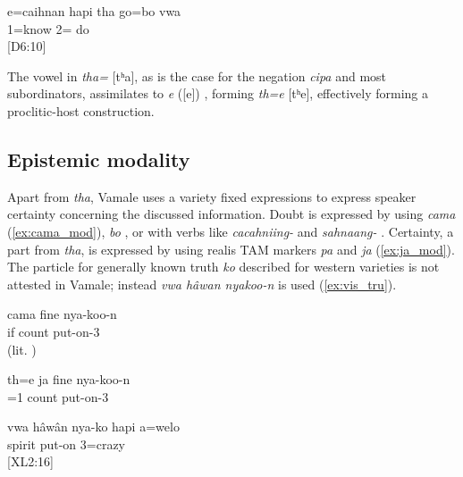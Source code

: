 \ea \label{ex:tha_bo}
\gll e=caihnan hapi {tha} go={bo} vwa\\
 1=know   2= do\\
\glt {} {[D6:10]}
\z

The vowel in \textit{tha=} [tʰa], as is the case for the negation \textit{cipa} and most subordinators, assimilates to \textit{e} ([e]) , forming \textit{th=e} [tʰe], effectively forming a proclitic-host construction.

\subsection{Epistemic modality}
\begin{sloppypar}
Apart from \textit{tha}, Vamale uses a variety fixed expressions to express speaker certainty concerning the discussed information. Doubt is expressed by using \textit{cama}  (\ref{ex:cama_mod}), \textit{bo} , or with verbs like \textit{cacahniing-}  and \textit{sahnaang-} . Certainty, a part from \textit{tha}, is expressed by using realis TAM markers \textit{pa}  and \textit{ja}  (\ref{ex:ja_mod}). The particle for generally known truth \textit{ko} described for western varieties \parencite[55]{rivierre_bwatoo_2006} is not attested in Vamale; instead \textit{vwa hâwan nyakoo-n}  is used (\ref{ex:vis_tru}).
\end{sloppypar}

	
	\ea \label{ex:cama_mod}
	\gll cama fine nya-koo-n\\
	 if count put-on-3\\
	\glt {} (lit. )
	\z	
	
	\ea\label{ex:ja_mod}
	\gll th=e ja fine nya-koo-n\\
	 =1 count  put-on-3\\
	\glt {}
	\z 


\ea \label{ex:vis_tru}
\gll vwa hâwân nya-ko hapi a=welo\\
  spirit put-on  3=crazy\\
\glt {} {[XL2:16]}
\z


